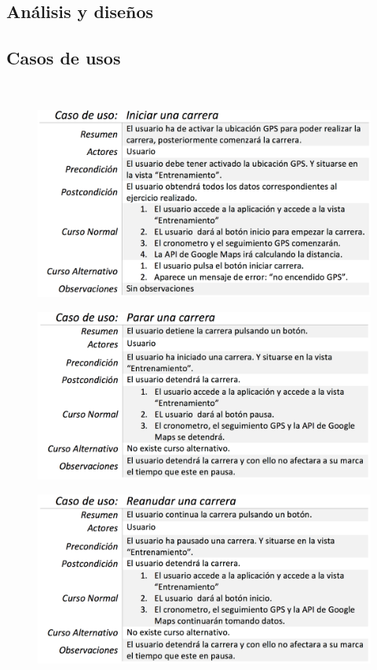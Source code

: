 \documentclass[a4paper, 11pt]{article}
\begin{document}
\begin{itemize}
\section{Análisis y diseños}

       \subsection{Casos de usos}\\

            \begin{figure}[H]
             \centering
             \includegraphics[width=1\textwidth]{iniciar-una-carrera}
            \end{figure}

            \begin{figure}[H]
             \centering
             \includegraphics[width=1\textwidth]{parar-una-carrera}
            \end{figure}

            \begin{figure}[H]
              \centering
              \includegraphics[width=1\textwidth]{reanudar-una-carrera}
            \end{figure}


\end{itemize}
\end{document}
